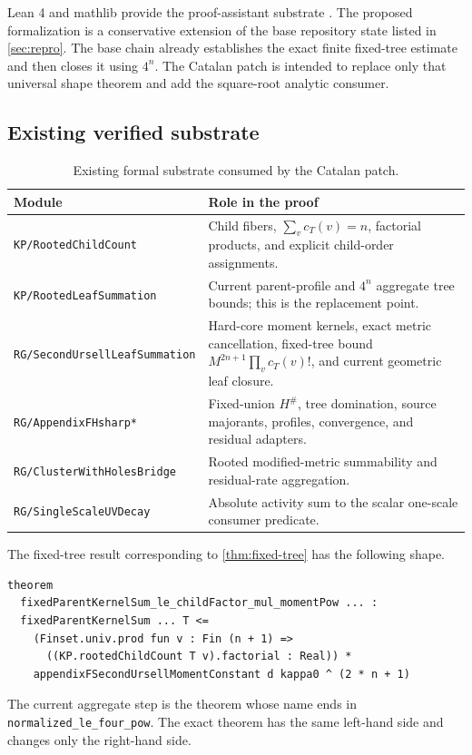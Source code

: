 \documentclass[11pt,a4paper]{article}
\theoremstyle{definition}
\newcommand{\Hsharp}{H^{\#}}
\begin{document}
Lean 4 and mathlib provide the proof-assistant substrate
\cite{deMouraLean2015,Mathlib2020}.  The proposed formalization is a conservative extension of
the base repository state listed in \cref{sec:repro}.  The base chain already establishes
the exact finite fixed-tree estimate and then closes it using $4^n$.  The Catalan patch
is intended to replace only that universal shape theorem and add the square-root
analytic consumer.

\subsection{Existing verified substrate}

\begin{table}[ht]
\centering
\footnotesize
\begin{tabular}{>{\raggedright\arraybackslash}p{}
                >{\raggedright\arraybackslash}p{}}
\toprule
Module & Role in the proof \\
\midrule
\texttt{KP/RootedChildCount}
 & Child fibers, $\sum_v c_T(v)=n$, factorial products, and explicit child-order assignments. \\
\texttt{KP/RootedLeafSummation}
 & Current parent-profile and $4^n$ aggregate tree bounds; this is the replacement point. \\
\texttt{RG/SecondUrsellLeafSummation}
 & Hard-core moment kernels, exact metric cancellation, fixed-tree bound
   $M^{2n+1}\prod_v c_T(v)!$, and current geometric leaf closure. \\
\texttt{RG/AppendixFHsharp*}
 & Fixed-union $\Hsharp$, tree domination, source majorants, profiles, convergence, and residual adapters. \\
\texttt{RG/ClusterWithHolesBridge}
 & Rooted modified-metric summability and residual-rate aggregation. \\
\texttt{RG/SingleScaleUVDecay}
 & Absolute activity sum to the scalar one-scale consumer predicate. \\
\bottomrule
\end{tabular}
\caption{Existing formal substrate consumed by the Catalan patch.}
\label{tab:modules}
\end{table}

The fixed-tree result corresponding to \cref{thm:fixed-tree} has the following shape.
\begin{lstlisting}
theorem
  fixedParentKernelSum_le_childFactor_mul_momentPow ... :
  fixedParentKernelSum ... T <=
    (Finset.univ.prod fun v : Fin (n + 1) =>
      ((KP.rootedChildCount T v).factorial : Real)) *
    appendixFSecondUrsellMomentConstant d kappa0 ^ (2 * n + 1)
\end{lstlisting}
The current aggregate step is the theorem whose name ends in
\texttt{normalized\_le\_four\_pow}.  The exact theorem has the same left-hand side
and changes only the right-hand side.
\end{document}
